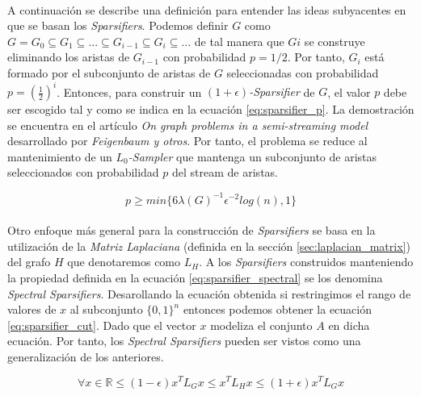 \documentclass{subfiles}
\begin{document}
        \paragraph{}
        A continuación se describe una definición para entender las ideas subyacentes en que se basan los \emph{Sparsifiers}. Podemos definir $G$ como $G = G_0 \subseteq G_1 \subseteq ...  \subseteq G_{i-1} \subseteq G_i \subseteq ... $ de tal manera que $Gi$ se construye eliminando los aristas de $G_{i-1}$ con probabilidad $p = 1/2$. Por tanto, $G_i$ está formado por el subconjunto de aristas de $G$ seleccionadas con probabilidad $p = (\frac{1}{2})^i$. Entonces, para construir un \emph{$(1 +\epsilon)$-Sparsifier} de $G$, el valor $p$ debe ser escogido tal y como se indica en la ecuación \eqref{eq:sparsifier_p}. La demostración se encuentra en el artículo \emph{On graph problems in a semi-streaming model} \cite{feigenbaum2005graph} desarrollado por \emph{Feigenbaum y otros}. Por tanto, el problema se reduce al mantenimiento de un \emph{$L_{0}$-Sampler} que mantenga un subconjunto de aristas seleccionados con probabilidad $p$ del stream de aristas.

        \begin{equation}
        \label{eq:sparsifier_p}
          p \geq min\{6\lambda(G)^{-1}\epsilon^{-2}log(n),1\}
        \end{equation}

        \paragraph{}
        Otro enfoque más general para la construcción de \emph{Sparsifiers} se basa en la utilización de la \emph{Matriz Laplaciana} (definida en la sección \ref{sec:laplacian_matrix}) del grafo $H$ que denotaremos como $L_{H}$. A los \emph{Sparsifiers} construidos manteniendo la propiedad definida en la ecuación \eqref{eq:sparsifier_spectral} se los denomina \emph{Spectral Sparsifiers}. Desarollando la ecuación obtenida si restringimos el rango de valores de $x$ al subconjunto $\{ 0, 1\}^n$ entonces podemos obtener la ecuación \ref{eq:sparsifier_cut}. Dado que el vector $x$ modeliza el conjunto $A$ en dicha ecuación. Por tanto, los \emph{Spectral Sparsifiers} pueden ser vistos como una generalización de los anteriores.

        \begin{equation}
        \label{eq:sparsifier_spectral}
          \forall x \in \mathbb{R} \leq (1 - \epsilon) x^TL_{G}x \leq x^TL_{H}x \leq (1 + \epsilon) x^TL_{G}x
        \end{equation}
\end{document}
